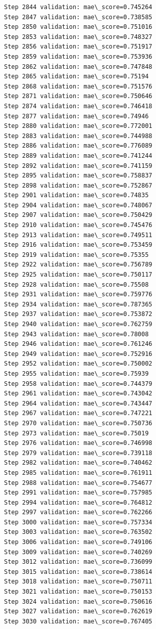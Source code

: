 \documentclass[11pt]{article}
\begin{document}
\begin{Verbatim}[commandchars=\\\{\}]
Step 2844 validation: mae\_score=0.745264
Step 2847 validation: mae\_score=0.738585
Step 2850 validation: mae\_score=0.751016
Step 2853 validation: mae\_score=0.748327
Step 2856 validation: mae\_score=0.751917
Step 2859 validation: mae\_score=0.753936
Step 2862 validation: mae\_score=0.747848
Step 2865 validation: mae\_score=0.75194
Step 2868 validation: mae\_score=0.751576
Step 2871 validation: mae\_score=0.750646
Step 2874 validation: mae\_score=0.746418
Step 2877 validation: mae\_score=0.74946
Step 2880 validation: mae\_score=0.772001
Step 2883 validation: mae\_score=0.744988
Step 2886 validation: mae\_score=0.776089
Step 2889 validation: mae\_score=0.741244
Step 2892 validation: mae\_score=0.741159
Step 2895 validation: mae\_score=0.758837
Step 2898 validation: mae\_score=0.752867
Step 2901 validation: mae\_score=0.74835
Step 2904 validation: mae\_score=0.748067
Step 2907 validation: mae\_score=0.750429
Step 2910 validation: mae\_score=0.745476
Step 2913 validation: mae\_score=0.749511
Step 2916 validation: mae\_score=0.753459
Step 2919 validation: mae\_score=0.75355
Step 2922 validation: mae\_score=0.756789
Step 2925 validation: mae\_score=0.750117
Step 2928 validation: mae\_score=0.75508
Step 2931 validation: mae\_score=0.759776
Step 2934 validation: mae\_score=0.787365
Step 2937 validation: mae\_score=0.753872
Step 2940 validation: mae\_score=0.762759
Step 2943 validation: mae\_score=0.78008
Step 2946 validation: mae\_score=0.761246
Step 2949 validation: mae\_score=0.752916
Step 2952 validation: mae\_score=0.750002
Step 2955 validation: mae\_score=0.75939
Step 2958 validation: mae\_score=0.744379
Step 2961 validation: mae\_score=0.743042
Step 2964 validation: mae\_score=0.743447
Step 2967 validation: mae\_score=0.747221
Step 2970 validation: mae\_score=0.750736
Step 2973 validation: mae\_score=0.75019
Step 2976 validation: mae\_score=0.746998
Step 2979 validation: mae\_score=0.739118
Step 2982 validation: mae\_score=0.740462
Step 2985 validation: mae\_score=0.761911
Step 2988 validation: mae\_score=0.754677
Step 2991 validation: mae\_score=0.757985
Step 2994 validation: mae\_score=0.764812
Step 2997 validation: mae\_score=0.762266
Step 3000 validation: mae\_score=0.757334
Step 3003 validation: mae\_score=0.763502
Step 3006 validation: mae\_score=0.749106
Step 3009 validation: mae\_score=0.740269
Step 3012 validation: mae\_score=0.736099
Step 3015 validation: mae\_score=0.738614
Step 3018 validation: mae\_score=0.750711
Step 3021 validation: mae\_score=0.750153
Step 3024 validation: mae\_score=0.750616
Step 3027 validation: mae\_score=0.762619
Step 3030 validation: mae\_score=0.767405

\end{Verbatim}
\end{document}
